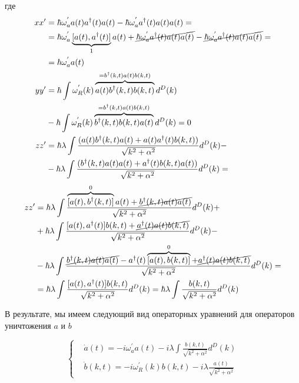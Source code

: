 где
\begin{equation}\notag
\begin{split}
    xx' & = \hbar \omega^{'}_a a(t) a^{\dagger}(t) a(t) - \hbar \omega^{'}_a a^{\dagger}(t) a(t) a(t) = \\
    & = \hbar \omega^{'}_a \underbrace{[a(t), a^{\dagger}(t)]}_{1} a(t)
    + \cancel{\hbar \omega^{'}_a a^{\dagger}(t) a(t) a(t)}
    - \cancel{\hbar \omega^{'}_a a^{\dagger}(t) a(t) a(t)} = \\
    & = \hbar \omega^{'}_a a(t) \\
    yy' & = \hbar \int \omega^{'}_{R}(k) \overbrace{a(t) b^{\dagger}(k,t) b(k,t)}^{= b^{\dagger}(k,t) a(t) b(k,t)} d^{D}(k) \\
    & - \hbar \int \omega^{'}_{R}(k) \overbrace{b^{\dagger}(k,t) b(k,t) a(t)}^{= b^{\dagger}(k,t) a(t) b(k,t)} d^{D}(k) = 0 \\
    zz' & = \hbar \lambda \int \frac{(a(t) b^{\dagger}(k,t) a(t)
    + a(t) a^{\dagger}(t) b(k,t))}{\sqrt{k^{2} + \alpha^{2}}} d^{D}(k) - \\
    & - \hbar \lambda \int \frac{(b^{\dagger}(k,t) a(t) a(t)
    + a^{\dagger}(t) b(k,t) a(t))}{\sqrt{k^{2} + \alpha^{2}}} d^{D}(k) = \\
\end{split}
\end{equation}
\begin{equation}\notag
\begin{split}
    zz' & = \hbar \lambda \int \frac{\overbrace{[a(t), b^{\dagger}(k,t)]}^{0} a(t) + \cancel{b^{\dagger}(k,t) a(t) a(t)}}{\sqrt{k^{2} + \alpha^{2}}} d^{D}(k) + \\
    & + \hbar \lambda \int \frac{[a(t), a^{\dagger}(t)] b(k,t) + \cancel{a^{\dagger}(t) a(t) b(k,t)}}{\sqrt{k^{2} + \alpha^{2}}} d^{D}(k) - \\
    & - \hbar \lambda \int \frac{\cancel{b^{\dagger}(k,t) a(t) a(t)} - a^{\dagger}(t) \overbrace{[a(t), b(k,t)]}^{0} +
    \cancel{a^{\dagger}(t) a(t) b(k,t)} }{\sqrt{k^{2} + \alpha^{2}}} d^{D}(k) = \\
    & = \hbar \lambda \int \frac{[a(t), a^{\dagger}(t)] b(k,t)}{\sqrt{k^{2} + \alpha^{2}}} d^{D}(k) =
    \hbar \lambda \int \frac{b(k,t)}{\sqrt{k^{2} + \alpha^{2}}} d^{D}(k)
\end{split}
\end{equation}


В результате, мы имеем следующий вид операторных уравнений для операторов уничтожения $a$ и $b$

{\large
\begin{equation}\label{syst}
\begin{cases}
    & \dot{a}(t) = -i \omega^{'}_a a(t) - i \lambda \int \frac{b(k,t)}{\sqrt{k^{2} + \alpha^{2}}} d^{D}(k) \\
    & \dot{b}(k,t) = -i \omega^{'}_{R}(k) b(k,t) -i \lambda \frac{a(t)}{\sqrt{k^{2} + \alpha^{2}}}
\end{cases}
\end{equation}}


